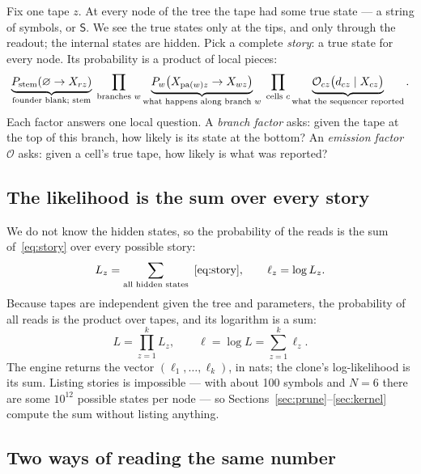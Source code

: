 \documentclass[11pt]{article}
\newcommand{\Sil}{\mathsf{S}}               %
\newcommand{\pa}{\mathrm{pa}}
\begin{document}
Fix one tape $z$. At every node of the tree the tape had some true state --- a string of symbols, or
$\Sil$. We see the true states only at the tips, and only through the readout; the internal states
are hidden. Pick a complete \emph{story}: a true state for every node. Its probability is a product
of local pieces:
\begin{equation}
\underbrace{P_{\rm stem}(\varnothing\to X_{rz})}_{\text{founder blank; stem}}\;
\prod_{\text{branches }w}\underbrace{P_w\big(X_{\pa(w)z}\to X_{wz}\big)}_{\text{what happens along branch }w}\;
\prod_{\text{cells }c}\underbrace{\mathcal O_{cz}\big(d_{cz}\mid X_{cz}\big)}_{\text{what the sequencer reported}} .
\label{eq:story}
\end{equation}
Each factor answers one local question. A \emph{branch factor} asks: given the tape at the top of
this branch, how likely is its state at the bottom? An \emph{emission factor} $\mathcal O$ asks:
given a cell's true tape, how likely is what was reported?

\subsection{The likelihood is the sum over every story}

We do not know the hidden states, so the probability of the reads is the sum of~\eqref{eq:story}
over every possible story:
\begin{equation}
L_z=\sum_{\text{all hidden states}}\ \eqref{eq:story},\qquad \ell_z=\log L_z .
\label{eq:Lz}
\end{equation}
Because tapes are independent given the tree and parameters, the probability of all reads is the
product over tapes, and its logarithm is a sum:
\begin{equation}
L=\prod_{z=1}^{k}L_z,\qquad \ell=\log L=\sum_{z=1}^{k}\ell_z .
\label{eq:product}
\end{equation}
The engine returns the vector $(\ell_1,\dots,\ell_k)$, in nats; the clone's log-likelihood is its
sum. Listing stories is impossible --- with about 100 symbols and $N=6$ there are some $10^{12}$
possible states per node --- so Sections~\ref{sec:prune}--\ref{sec:kernel} compute the sum without
listing anything.

\subsection{Two ways of reading the same number}\label{sec:normalise}
\end{document}
